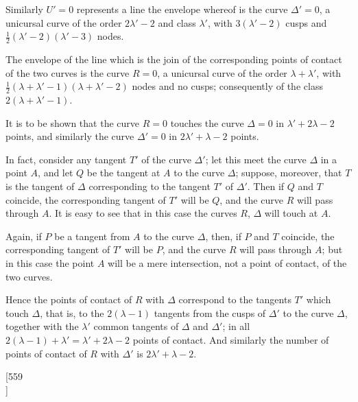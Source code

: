 \documentclass[11pt,a4paper]{book}
\begin{document}
Similarly $U' = 0$ represents a line the envelope whereof is the curve $\Delta' = 0$, a unicursal curve of the order $2\lambda' - 2$ and class $\lambda'$, with $3(\lambda' - 2)$ cusps and $\tfrac{1}{2}(\lambda' - 2)(\lambda' - 3)$ nodes.

\newpage
\setcounter{page}{17}

The envelope of the line which is the join of the corresponding points of contact of the two curves is the curve $R = 0$, a unicursal curve of the order $\lambda + \lambda'$, with $\tfrac{1}{2}(\lambda + \lambda' - 1)(\lambda + \lambda' - 2)$ nodes and no cusps; consequently of the class $2(\lambda + \lambda' - 1)$.

It is to be shown that the curve $R = 0$ touches the curve $\Delta = 0$ in $\lambda' + 2\lambda - 2$ points, and similarly the curve $\Delta' = 0$ in $2\lambda' + \lambda - 2$ points.

In fact, consider any tangent $T'$ of the curve $\Delta'$; let this meet the curve $\Delta$ in a point $A$, and let $Q$ be the tangent at $A$ to the curve $\Delta$; suppose, moreover, that $T$ is the tangent of $\Delta$ corresponding to the tangent $T'$ of $\Delta'$. Then if $Q$ and $T$ coincide, the corresponding tangent of $T'$ will be $Q$, and the curve $R$ will pass through $A$. It is easy to see that in this case the curves $R$, $\Delta$ will touch at $A$.

Again, if $P$ be a tangent from $A$ to the curve $\Delta$, then, if $P$ and $T$ coincide, the corresponding tangent of $T'$ will be $P$, and the curve $R$ will pass through $A$; but in this case the point $A$ will be a mere intersection, not a point of contact, of the two curves.

Hence the points of contact of $R$ with $\Delta$ correspond to the tangents $T'$ which touch $\Delta$, that is, to the $2(\lambda - 1)$ tangents from the cusps of $\Delta'$ to the curve $\Delta$, together with the $\lambda'$ common tangents of $\Delta$ and $\Delta'$; in all $2(\lambda - 1) + \lambda' = \lambda' + 2\lambda - 2$ points of contact. And similarly the number of points of contact of $R$ with $\Delta'$ is $2\lambda' + \lambda - 2$.


\newpage
\setcounter{page}{18}

\begin{center}
[559\\
]
\end{center}
\end{document}
